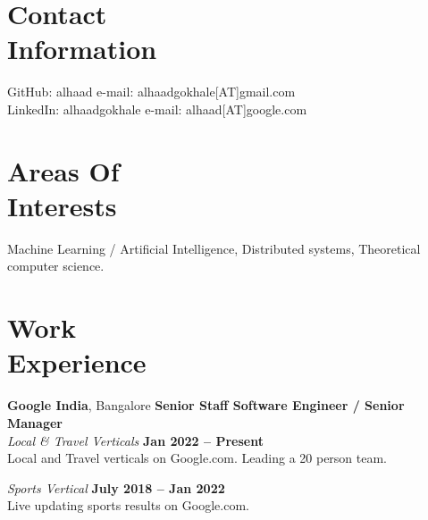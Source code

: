 \documentclass[margin,line]{resume}
\begin{document}
\begin{resume}

    \section{\mysidestyle Contact\\Information}

    GitHub: alhaad                            \hfill e-mail: alhaadgokhale[AT]gmail.com          \vspace{0mm}\\\vspace{0mm}%
    LinkedIn: alhaadgokhale                   \hfill e-mail: alhaad[AT]google.com  \vspace{0mm}\\\vspace{-4.5mm}%


    \section{\mysidestyle Areas Of\\Interests}

    Machine Learning / Artificial Intelligence, Distributed systems, Theoretical computer science.

    \section{\mysidestyle Work\\Experience}

    \textbf{Google India}, Bangalore \hfill \textbf{Senior Staff Software Engineer / Senior Manager} \vspace{2mm}\\\vspace{1mm}%
    \textsl{Local \& Travel Verticals} \hfill \textbf{Jan 2022 -- Present}\\
    Local and Travel verticals on Google.com. Leading a 20 person team.

    \textsl{Sports Vertical} \hfill \textbf{July 2018 -- Jan 2022}\\
    Live updating sports results on Google.com.
 

\end{resume}
\end{document}
